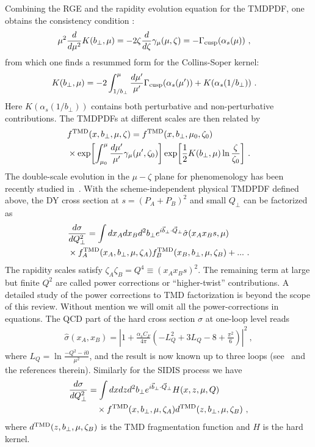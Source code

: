 \documentclass[aps,rmp,reprint,amsmath,amssymb,graphicx,longbibliography]{revtex4-1} %
\newcommand{\nn}{\nonumber}
\begin{document}
Combining the RGE and the rapidity evolution equation for the TMDPDF, one obtains the consistency condition :
\begin{align}
	\mu^2 \frac{d}{d\mu^2} K(b_\perp,\mu)
	&= -2 \zeta \frac{d}{d\zeta} \gamma_\mu(\mu,\zeta) =- \Gamma_{\rm cusp}(\alpha_s(\mu)) \ ,
\end{align}
from which one finds a resummed form for the Collins-Soper kernel:
\begin{align}
	K(b_\perp,\mu) &= -2 \int_{1/b_\perp}^\mu \frac{d\mu'}{\mu'} \Gamma_{\rm cusp}(\alpha_s(\mu')) + K(\alpha_s(1/b_\perp)) \ .
\end{align}
Here $K(\alpha_s(1/b_\perp))$ contains both perturbative and non-perturbative contributions. The TMDPDFs at different scales are then related by
\begin{align} \label{eq:tmd_evolution}
	&f^{\rm TMD}(x, b_\perp, \mu, \zeta) = f^{\rm TMD}(x, b_\perp, \mu_0, \zeta_0) \\
	& \times\exp\biggl[ \int_{\mu_0}^\mu \frac{d\mu'}{\mu'} \gamma_\mu(\mu',\zeta_0) \biggr]
	\exp\biggl[ \frac12 K(b_\perp,\mu) \ln\frac{\zeta}{\zeta_0} \biggr]  \ . \nn
\end{align}
The double-scale evolution in the $\mu-\zeta$ plane for phenomenology has been recently studied in~\cite{Scimemi:2018xaf}.
With the scheme-independent physical TMDPDF defined above, the DY cross section at $s=(P_A+P_B)^2$ and small $Q_\perp$ can be factorized as
\begin{align}
	&\frac{d\sigma}{dQ_\perp^2}=\int dx_Adx_B d^2b_\perp e^{i\vec{b}_\perp \cdot \vec{Q}_\perp}\hat \sigma(x_Ax_Bs,\mu)\nonumber \\ &\times f_A^{\rm TMD}(x_A,b_\perp,\mu,\zeta_A)f_B^{\rm TMD}(x_B,b_\perp,\mu,\zeta_B)+ ... \ .
\end{align}
The rapidity scales satisfy $\zeta_A\zeta_B= Q^4\equiv(x_Ax_Bs)^2$. The remaining term at large but finite $Q^2$ are called power corrections or ``higher-twist'' contributions. A detailed study of the power corrections to TMD factorization is beyond the scope of this review. Without mention we will omit all the power-corrections in equations. The QCD part of the hard cross section $\hat{\sigma}$ at one-loop level reads
\begin{align}
	\hat \sigma(x_A,x_B)=\left|1+\frac{\alpha_sC_F}{4\pi}\left(-L^2_{Q}+3L_Q-8+\frac{\pi^2}{6}\right)\right|^2 \ ,
\end{align}
where $L_Q=\ln \frac{-Q^2-i0}{\mu^2}$, and the result is now known up to three loops (see~\cite{Moch:2005tm,Baikov:2009bg,Lee:2010cga,Gehrmann:2010ue} and the references therein). Similarly for the SIDIS process we have
\begin{align}
	\frac{d\sigma}{dQ_\perp^2}&=\int dxdz d^2b_\perp e^{i\vec{b}_\perp \cdot \vec{Q}_\perp}H(x,z,\mu,Q)\nonumber \\
	&\quad \times f^{\rm TMD}(x,b_\perp,\mu,\zeta_A)d^{\rm TMD}(z,b_\perp,\mu,\zeta_B) \ ,
\end{align}
where $d^{\rm TMD}(z,b_\perp,\mu,\zeta_B)$ is the TMD fragmentation function and $H$ is the hard kernel.
\end{document}
